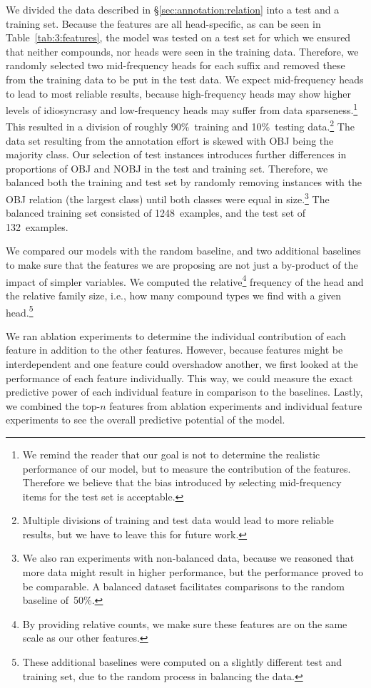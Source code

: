 \documentclass[output=paper]{langsci/langscibook}
\begin{document}
We divided the data described in §\ref{sec:annotation:relation} into a test and a training set. Because the features are all head-specific, as can be seen in Table~\ref{tab:3:features}, the model was tested on a test set for which we ensured that neither compounds, nor heads were seen in the training data. Therefore, we randomly selected two mid-frequency heads for each suffix and removed these from the training data to be put in the test data. We expect mid-frequency heads to lead to most reliable results, because high-frequency heads may show higher levels of idiosyncrasy and low-frequency heads may suffer from data sparseness.\footnote{We remind the reader that our goal is not to determine the realistic performance of our model, but to measure the contribution of the features. Therefore we believe that the bias introduced by selecting mid-frequency items for the test set is acceptable.} This resulted in a division of roughly 90\%~training and 10\%~testing data.\footnote{Multiple divisions of training and test data would lead to more reliable results, but we have to leave this for future work.} 
The data set resulting from the annotation effort is skewed with OBJ being the majority class.
Our selection of test instances introduces further differences in proportions of OBJ and NOBJ in the test and training set.
Therefore, we balanced both the training and test set by randomly removing instances with the OBJ relation (the largest class) until both classes were equal in size.\footnote{We also ran experiments with non-balanced data, because we reasoned that more data might result in higher performance, but the performance proved to be comparable. A balanced dataset facilitates comparisons to the random baseline of~50\%.}  The balanced training set consisted of 1248~examples, and the test set of 132~examples.

We compared our models with the random baseline, and two additional baselines to make sure  that the features we are proposing are not just a by-product of the impact of simpler variables. We computed the relative\footnote{By providing relative counts, we make sure these features are on the same scale as our other features.}  frequency of the head and the relative family size, i.e., how many compound types we find with a given head.\footnote{These additional baselines were computed on a slightly different test and training set, due to the random process in balancing the data.}

We ran ablation experiments to determine the individual contribution of each feature in addition to the other features. However, because features might be interdependent and one feature could overshadow another, we first looked at the performance of each feature individually.
This way, we could measure the exact predictive power of each individual feature in comparison to the baselines. Lastly, we combined the top-$n$ features from ablation experiments and individual feature experiments to see the overall predictive potential of the model.
\end{document}
